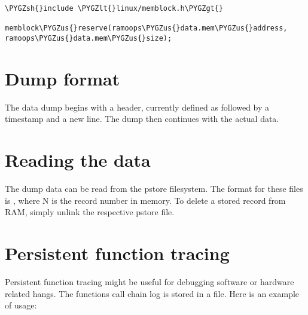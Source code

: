 \documentclass[a4paper,8pt,english]{sphinxmanual}
\def\PYGZus{\char`\_}
\def\PYGZlt{\char`\<}
\def\PYGZgt{\char`\>}
\def\PYGZsh{\char`\#}
\begin{document}
\begin{Verbatim}[commandchars=\\\{\}]
\PYGZsh{}include \PYGZlt{}linux/memblock.h\PYGZgt{}

memblock\PYGZus{}reserve(ramoops\PYGZus{}data.mem\PYGZus{}address, ramoops\PYGZus{}data.mem\PYGZus{}size);
\end{Verbatim}


\section{Dump format}
\label{admin-guide/ramoops:dump-format}
The data dump begins with a header, currently defined as \code{====} followed by a
timestamp and a new line. The dump then continues with the actual data.


\section{Reading the data}
\label{admin-guide/ramoops:reading-the-data}
The dump data can be read from the pstore filesystem. The format for these
files is , where N is the record number in memory. To delete
a stored record from RAM, simply unlink the respective pstore file.


\section{Persistent function tracing}
\label{admin-guide/ramoops:persistent-function-tracing}
Persistent function tracing might be useful for debugging software or hardware
related hangs. The functions call chain log is stored in a 
file. Here is an example of usage:
\end{document}
